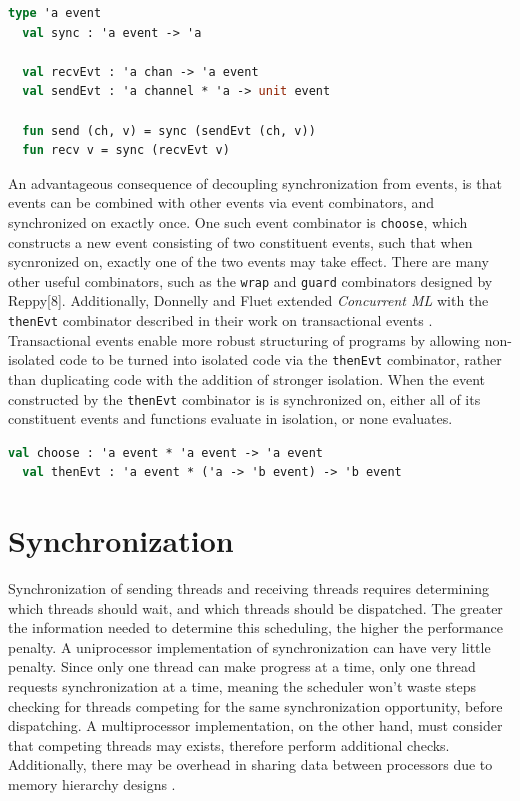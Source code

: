 \documentclass[10pt]{article}
\begin{document}
\begin{lstlisting}[language=ML, mathescape]
  type 'a event
  val sync : 'a event -> 'a

  val recvEvt : 'a chan -> 'a event
  val sendEvt : 'a channel * 'a -> unit event

  fun send (ch, v) = sync (sendEvt (ch, v))
  fun recv v = sync (recvEvt v)
\end{lstlisting}

An advantageous consequence of decoupling synchronization from events, is that events can be
combined with other events via event combinators, and synchronized on exactly once. One such
event combinator is \lstinline{choose}, which constructs a new event consisting of two
constituent events, such that when sycnronized on, exactly one of the two events may take
effect. There are many other useful combinators, such as the \lstinline{wrap} and
\lstinline{guard} combinators designed by Reppy[8]. Additionally, Donnelly and Fluet extended
\textit{Concurrent ML} with the \lstinline{thenEvt} combinator described in their work on
transactional events \cite{donnelly2008transactional}. Transactional events enable more robust
structuring of programs by allowing non-isolated code to be turned into isolated code via
the \lstinline{thenEvt} combinator, rather than duplicating code with the addition of stronger
isolation. When the event constructed by the \lstinline{thenEvt} combinator is is synchronized
on, either all of its constituent events and functions evaluate in isolation, or none
evaluates.

\begin{lstlisting}[language=ML, mathescape]
  val choose : 'a event * 'a event -> 'a event
  val thenEvt : 'a event * ('a -> 'b event) -> 'b event
  \end{lstlisting}

\section{Synchronization}
Synchronization of sending threads and receiving threads
requires determining which threads should wait, and which threads should be dispatched.
The greater the information needed
to determine this scheduling, the higher the performance penalty. A uniprocessor
implementation of synchronization can have very little penalty. Since only one thread can make
progress at a time, only one thread requests synchronization at a time, meaning the scheduler
won't waste steps checking for threads competing for the same synchronization opportunity,
before dispatching. A multiprocessor implementation, on the other hand, must consider that
competing threads may exists, therefore perform additional checks. Additionally, there may be 
overhead in sharing data between processors due to memory hierarchy designs \cite{hennessy2011computer}. 
\end{document}
